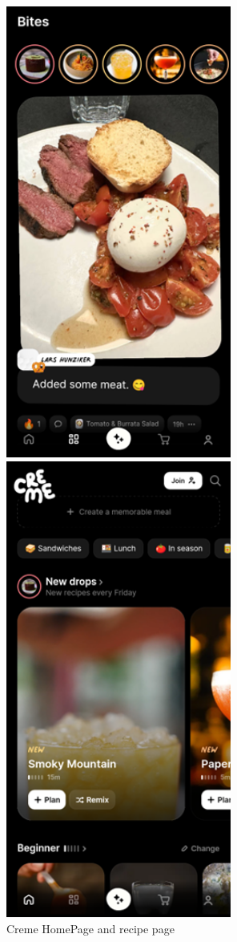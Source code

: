 \documentclass[]{project_final}
\begin{document}
\begin{figure}[ht!]
  \centering
  \begin{minipage}[t]{0.4\textwidth}
    \includegraphics[width=20em]{cremeImage1.png}
  \end{minipage}
  \hfill
  \begin{minipage}[t]{0.4\textwidth}
    \includegraphics[width=20em]{cremeImage2.png}
  \end{minipage}
  \caption{Creme HomePage and recipe page}
  \label{fig:1}
\end{figure}
\end{document}
